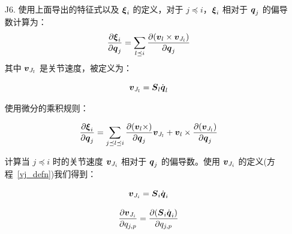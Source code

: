\documentclass[letterpaper, 10 pt, conference]{ieeetran}  %
\begin{document}
{\begin{enumerate}
扩展各项：

\begin{equation}
    \begin{aligned}
    \frac{\partial (\I_{i} \v_{i})}{\partial \q_{j}} = (\I_{i} \v_{i}) \crff \Phibar_{j} + \I_{i}(\v_{i} \times \Phibar_{j})  + \\
    \I_{i} ( \v_{\lambda(j)} \times \Phibar_{j})  - \I_{i} (\v_{i} \times \Phibar_{j}) 
    \label{dIv_eq3}
    \end{aligned}
\end{equation}

消除并化简后，方程(\ref{dIv_eq3})变为：

\begin{equation}
    \frac{\partial (\I_{i} \v_{i})}{\partial \q_{j}} = (\I_{i} \v_{i}) \crff \Phibar_{j} + \I_{i}(\Psibardot_{j})
    \label{dIv_eq4}
\end{equation}

其中 $\Psibardot_{j}$ 在方程(\ref{psidot_psidotdot_defn})中定义。

\item[J6.] 使用上面导出的特征式以及 $\boldsymbol{\xi}_{i}$ 的定义，对于 $j \preceq i$，$\boldsymbol{\xi}_{i}$ 相对于 $\boldsymbol{q}_{j}$ 的偏导数计算为：
\begin{equation}
    \frac{\partial \xibar_{i}}{\partial \q_{j}} = \sum_{l \preceq i} \frac{\partial (\v_{l} \times \vJ{l})}{\partial \q_{j}}  
    \label{dxi_eq1}
\end{equation}
其中 $\boldsymbol{v}_{J_{l}}$ 是关节速度，被定义为：

\begin{equation}
    \vJ{l} = \Phibar_{l} \qd_{l}
    \label{vj_defn}
\end{equation}

 使用微分的乘积规则：

\begin{equation}
    \frac{\partial \xibar_{i}}{\partial \q_{j}} = \sum_{j \preceq l \preceq i} \frac{\partial (\v_{l} \times )}{\partial \q_{j}}  \vJ{l} + \v_{l} \times \frac{\partial (\vJ{l} )}{\partial \q_{j}}  
    \label{dxi_eq2}
\end{equation}

计算当 $j \preceq i$ 时的关节速度 $\boldsymbol{v}_{J_{i}}$ 相对于 $\boldsymbol{q}_{j}$ 的偏导数。使用 $\boldsymbol{v}_{J_{i}}$ 的定义(方程~\ref{vj_defn})我们得到：

\begin{equation}
    \vJ{i} = \Phibar_{i} \qd_{i}
    \label{vj_defn}
\end{equation}

\begin{equation}
    \frac{\partial \vJ{i}}{\partial q_{j,p}} = \frac{\partial (\Phibar_{i} \qd_{i})}{\partial q_{j,p}}  
    \label{dvj_eq1}
\end{equation}


\end{enumerate}}
\end{document}
